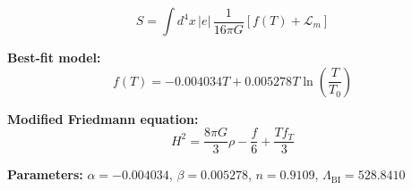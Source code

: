 
\begin{equation}
  S = \int d^4x \, |e| \, \frac{1}{16\pi G} \left[ f(T) + \mathcal{L}_m \right]
\end{equation}

\textbf{Best-fit model:}
\begin{equation}
  f(T) = -0.004034 T + 0.005278 T \ln\!\left(\frac{T}{T_0}\right)
\end{equation}

\textbf{Modified Friedmann equation:}
\begin{equation}
  H^2 = \frac{8\pi G}{3} \rho - \frac{f}{6} + \frac{T f_T}{3}
\end{equation}

\textbf{Parameters:}
$\alpha = -0.004034$, \quad
$\beta = 0.005278$, \quad
$n = 0.9109$, \quad
$\Lambda_{\text{BI}} = 528.8410$